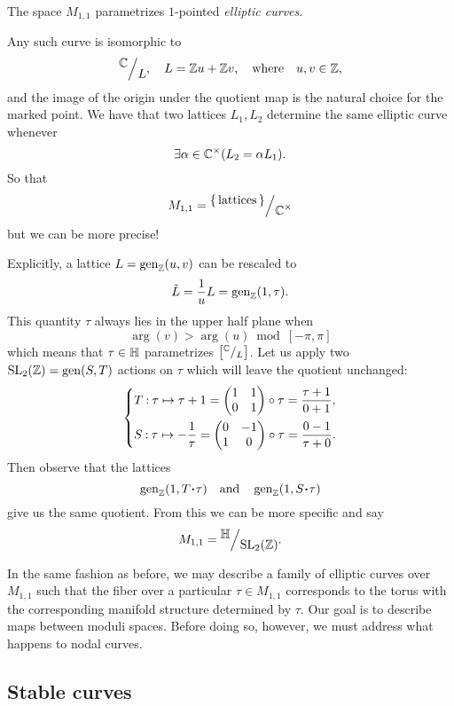 \documentclass[12pt]{memoir}
\begin{document}
\begin{Ex}
    The space $M_{1,1}$ parametrizes $1$-pointed \emph{elliptic curves}.\par
    Any such curve is isomorphic to 
    $$\quot{\bC}{L},\quad L=\bZ u+\bZ v,\word{where}u,v\in\bZ,$$
    and the image of the origin under the quotient map is the natural choice for the marked point. We have that two lattices $L_1,L_2$ determine the same elliptic curve whenever 
    $$\exists \alpha\in\mathbb{C}^\times(L_2=\alpha L_1).$$
    So that 
    $$M_{1,1}=\quot{\set{\text{lattices}}}{\bC^\x}$$
    but we can be more precise!\par
    Explicitly, a lattice $L=\operatorname{gen}_{\mathbb{Z}}(u,v)$ can be rescaled to
    $$\tilde{L}=\frac{1}{u}L=\operatorname{gen}_{\mathbb{Z}}(1,\tau).$$
    This quantity $\tau$ always lies in the upper half plane when 
    $$\arg(v)>\arg(u)\bmod[-\pi,\pi]$$
    which means that $\tau\in\mathbb{H}$ parametrizes $\bonj{\quot{\bC}{L}}$. 
    Let us apply two $\mathrm{SL}_2(\mathbb{Z})=\operatorname{gen}(S,T)$ actions on $\tau$ which will leave the quotient unchanged:
    $$
    \left\lbrace
    \begin{aligned}
        &T\mathbin{:}\tau\mapsto\tau+1=\begin{pmatrix} 1 & 1 \\ 0 & 1 \end{pmatrix}\circ\tau=\frac{\tau+1}{0+1},\\
        &S\mathbin{:}\tau\mapsto-\frac1\tau=\begin{pmatrix} 0 & -1 \\ 1 & 0 \end{pmatrix}\circ\tau=\frac{0-1}{\tau+0}.
    \end{aligned}
    \right.
    $$
    Then observe that the lattices
    $$\gen_\bZ(1,T\.\tau)\word{and}\gen_\bZ(1,S\.\tau)$$
    give us the same quotient. From this we can be more specific and say 
    $$M_{1,1}=\quot{\bH}{\rSL_2(\bZ)}.$$
\end{Ex}

In the same fashion as before, we may describe a family of elliptic curves over $M_{1,1}$ such that the fiber over a particular $\tau\in M_{1,1}$ corresponds to the torus with the corresponding manifold structure determined by $\tau$. Our goal is to describe maps between moduli spaces. Before doing so, however, we must address what happens to nodal curves.

\subsection{Stable curves}
\end{document}
